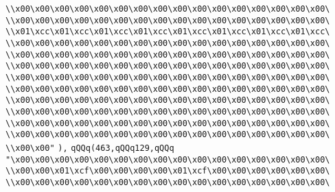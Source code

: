 \verb|\\x00\x00\x00\x00\x00\x00\x00\x00\x00\x00\x00\x00\x00\x00\x00\x00\|\newline
\verb|\\x00\x00\x00\x00\x00\x00\x00\x00\x00\x00\x00\x00\x00\x00\x00\x00\|\newline
\verb|\\x01\xcc\x01\xcc\x01\xcc\x01\xcc\x01\xcc\x01\xcc\x01\xcc\x01\xcc\|\newline
\verb|\\x00\x00\x00\x00\x00\x00\x00\x00\x00\x00\x00\x00\x00\x00\x00\x00\|\newline
\verb|\\x00\x00\x00\x00\x00\x00\x00\x00\x00\x00\x00\x00\x00\x00\x00\x00\|\newline
\verb|\\x00\x00\x00\x00\x00\x00\x00\x00\x00\x00\x00\x00\x00\x00\x00\x00\|\newline
\verb|\\x00\x00\x00\x00\x00\x00\x00\x00\x00\x00\x00\x00\x00\x00\x00\x00\|\newline
\verb|\\x00\x00\x00\x00\x00\x00\x00\x00\x00\x00\x00\x00\x00\x00\x00\x00\|\newline
\verb|\\x00\x00\x00\x00\x00\x00\x00\x00\x00\x00\x00\x00\x00\x00\x00\x00\|\newline
\verb|\\x00\x00\x00\x00\x00\x00\x00\x00\x00\x00\x00\x00\x00\x00\x00\x00\|\newline
\verb|\\x00\x00\x00\x00\x00\x00\x00\x00\x00\x00\x00\x00\x00\x00\x00\x00\|\newline
\verb|\\x00\x00\x00\x00\x00\x00\x00\x00\x00\x00\x00\x00\x00\x00\x00\x00\|\newline
\verb|\\x00\x00"|\newline
\verb|),|\newline
\verb|qQQq(463,qQQq129,qQQq|\newline
\verb|"\x00\x00\x00\x00\x00\x00\x00\x00\x00\x00\x00\x00\x00\x00\x00\x00\|\newline
\verb|\\x00\x00\x01\xcf\x00\x00\x00\x00\x01\xcf\x00\x00\x00\x00\x00\x00\|\newline
\verb|\\x00\x00\x00\x00\x00\x00\x00\x00\x00\x00\x00\x00\x00\x00\x00\x00\|\newline
